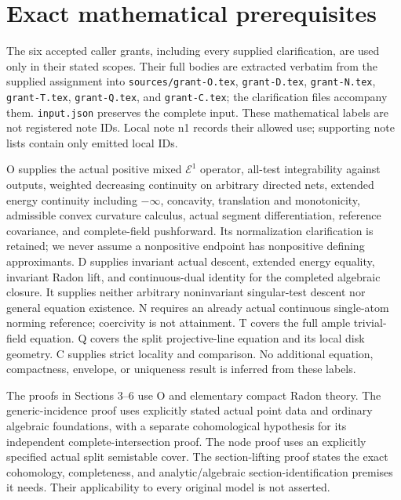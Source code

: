 \documentclass[
  11pt,
]{article}
\begin{document}
\section{Exact mathematical
prerequisites}\label{exact-mathematical-prerequisites}

The six accepted caller grants, including every supplied clarification,
are used only in their stated scopes. Their full bodies are extracted
verbatim from the supplied assignment into \texttt{sources/grant-O.tex},
\texttt{grant-D.tex}, \texttt{grant-N.tex}, \texttt{grant-T.tex},
\texttt{grant-Q.tex}, and \texttt{grant-C.tex}; the clarification files
accompany them. \texttt{input.json} preserves the complete input. These
mathematical labels are not registered note IDs. Local note n1 records
their allowed use; supporting note lists contain only emitted local IDs.

O supplies the actual positive mixed \(\mathcal E^1\) operator, all-test
integrability against outputs, weighted decreasing continuity on
arbitrary directed nets, extended energy continuity including
\(-\infty\), concavity, translation and monotonicity, admissible convex
curvature calculus, actual segment differentiation, reference
covariance, and complete-field pushforward. Its normalization
clarification is retained; we never assume a nonpositive endpoint has
nonpositive defining approximants. D supplies invariant actual descent,
extended energy equality, invariant Radon lift, and continuous-dual
identity for the completed algebraic closure. It supplies neither
arbitrary noninvariant singular-test descent nor general equation
existence. N requires an already actual continuous single-atom norming
reference; coercivity is not attainment. T covers the full ample
trivial-field equation. Q covers the split projective-line equation and
its local disk geometry. C supplies strict locality and comparison. No
additional equation, compactness, envelope, or uniqueness result is
inferred from these labels.

The proofs in Sections 3--6 use O and elementary compact Radon theory.
The generic-incidence proof uses explicitly stated actual point data and
ordinary algebraic foundations, with a separate cohomological hypothesis
for its independent complete-intersection proof. The node proof uses an
explicitly specified actual split semistable cover. The section-lifting
proof states the exact cohomology, completeness, and analytic/algebraic
section-identification premises it needs. Their applicability to every
original model is not asserted.
\end{document}
